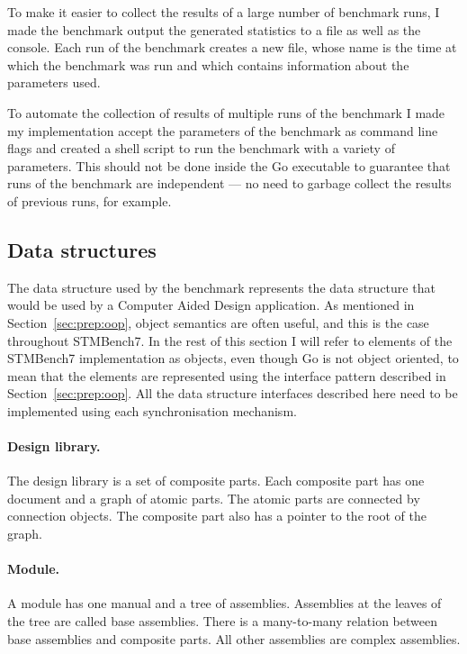 \documentclass[12pt,a4paper,oneside,openright]{report}
\begin{document}
To make it easier to collect the results of a large number of
benchmark runs, I made the benchmark output the generated statistics
to a file as well as the console. Each run of the benchmark creates a
new file, whose name is the time at which the benchmark was run and
which contains information about the parameters used.

To automate the collection of results of multiple runs of the
benchmark I made my implementation accept the parameters of the
benchmark as command line flags and created a shell script to run the
benchmark with a variety of parameters. This should not be done inside
the Go executable to guarantee that runs of the benchmark are
independent --- no need to garbage collect the results of previous
runs, for example.

\subsection{Data structures}
\label{sec:impl:data-structures}

The data structure used by the benchmark represents the data structure
that would be used by a Computer Aided Design application. As
mentioned in Section~\ref{sec:prep:oop}, object semantics are often
useful, and this is the case throughout STMBench7. In the rest of this
section I will refer to elements of the STMBench7 implementation as
objects, even though Go is not object oriented, to mean that the
elements are represented using the interface pattern described in
Section~\ref{sec:prep:oop}. All the data structure interfaces
described here need to be implemented using each synchronisation
mechanism.

\paragraph{Design library.} The design library is a set of composite
parts. Each composite part has one document and a graph of atomic
parts. The atomic parts are connected by connection objects. The
composite part also has a pointer to the root of the graph.

\paragraph{Module.} A module has one manual and a tree of
assemblies. Assemblies at the leaves of the tree are called base
assemblies. There is a many-to-many relation between base assemblies
and composite parts. All other assemblies are complex assemblies.
\end{document}
